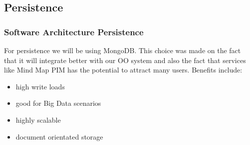 \documentclass{beamer}
\begin{document}
		
	\subsection{Persistence}
		\begin{frame}
		\frametitle{Software Architecture Persistence}
			For persistence we will be using MongoDB. This choice was made on the fact that it will integrate better with our OO system and also the fact that services like Mind Map PIM has the potential to attract many users.
			Benefits include:
			\begin{itemize}
				\item high write loads
				\item good for Big Data scenarios
				\item highly scalable
				\item document orientated storage
			\end{itemize}
		\end{frame}
		
\end{document}
